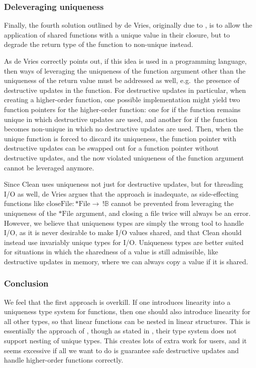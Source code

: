 \subsubsection{Deleveraging uniqueness}
Finally, the fourth solution outlined by de Vries, originally due to \cite{harrington_uniqueness_2006}, is to allow the application of shared functions with a unique value in their closure, but to degrade the return type of the function to non-unique instead. 

As de Vries correctly points out, if this idea is used in a programming language, then ways of leveraging the uniqueness of the function argument other than the uniqueness of the return value must be addressed as well, e.g.\ the presence of destructive updates in the function. For destructive updates in particular, when creating a higher-order function, one possible implementation might yield two function pointers for the higher-order function: one for if the function remains unique in which destructive updates are used, and another for if the function becomes non-unique in which no destructive updates are used. Then, when the unique function is forced to discard its uniqueness, the function pointer with destructive updates can be swapped out for a function pointer without destructive updates, and the now violated uniqueness of the function argument cannot be leveraged anymore.

Since Clean uses uniqueness not just for destructive updates, but for threading I/O as well, de Vries argues that the approach is inadequate, as side-effecting functions like $\mathrm{closeFile} : *\mathrm{File} \to\ !\mathbb{B}$ cannot be prevented from leveraging the uniqueness of the $*\mathrm{File}$ argument, and closing a file twice will always be an error. However, we believe that uniqueness types are simply the wrong tool to handle I/O, as it is never desirable to make I/O values shared, and that Clean should instead use invariably unique types for I/O. Uniqueness types are better suited for situations in which the sharedness of a value is still admissible, like destructive updates in memory, where we can always copy a value if it is shared.

\subsubsection{Conclusion}
We feel that the first approach is overkill. If one introduces linearity into a uniqueness type system for functions, then one should also introduce linearity for all other types, so that linear functions can be nested in linear structures. This is essentially the approach of \cite{sergey_linearity_2022}, though as stated in , their type system does not support nesting of unique types. This creates lots of extra work for users, and it seems excessive if all we want to do is guarantee safe destructive updates and handle higher-order functions correctly.

